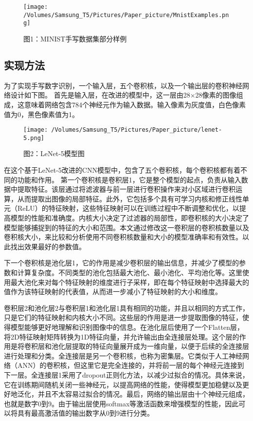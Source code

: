 \documentclass[11pt]{article}
\begin{document}
\begin{figure}[htbp]
\centering
\texttt{[image: /Volumes/Samsung\_T5/Pictures/Paper\_picture/MnistExamples.png]}
\caption{图1：MINIST手写数据集部分样例}
\end{figure}
\subsection{实现方法}
\label{sec:orge2ee836}
为了实现手写数字识别，一个输入层，五个卷积核，以及一个输出层的卷积神经网络设计如下图。
首先是输入层，在改进的模型中，这一层由28×28像素的图像组成，这意味着网络包含784个神经元作为输入数据。输入像素为灰度值，白色像素值为0，黑色像素值为1。

\begin{figure}[htbp]
\centering
\texttt{[image: /Volumes/Samsung\_T5/Pictures/Paper\_picture/lenet-5.png]}
\caption{图2：LeNet-5模型图}
\end{figure}

在这个基于LeNet-5改进的CNN模型中，包含了五个卷积核，每个卷积核都有着不同的功能和作用。
第一个卷积核是卷积层1，它是整个模型的起点，负责从输入数据中提取特征。该层通过将滤波器与前一层进行卷积操作来对小区域进行卷积运算，从而提取出图像的局部特征。此外，它包括多个具有可学习内核和修正线性单元（ReLU）的特征映射，这些特征映射可以在训练过程中不断调整和优化，以提高模型的性能和准确度。内核大小决定了过滤器的局部性，即卷积核的大小决定了模型能够捕捉到的特征的大小和范围。本文通过修改这一卷积层的卷积核数量以及卷积核大小，来比较和分析使用不同卷积核数量和大小的模型准确率和有效性。以此找出效果最好的参数值。

下一个卷积核是池化层1，它的作用是减少卷积层的输出信息，并减少了模型的参数和计算复杂度。不同类型的池化包括最大池化、最小池化、平均池化等。这里使用最大池化来对每个特征映射的维度进行子采样，即在每个特征映射中选择最大的值作为该特征映射的代表值，从而进一步减小了特征映射的大小和维度。

卷积层2和池化层2与卷积层1和池化层1具有相同的功能，并且以相同的方式工作，只是它们的特征映射和内核大小不同。这些层的作用是进一步提取图像的特征，使得模型能够更好地理解和识别图像中的信息。在池化层后使用了一个Flatten层，将2D特征映射矩阵转换为1D特征向量，并允许输出由全连接层处理。这个层的作用是将卷积层和池化层提取的特征向量展开成为一维向量，以便于后续的全连接层进行处理和分类。全连接层是另一个卷积核，也称为密集层。它类似于人工神经网络（ANN）的卷积核，但这里它是完全连接的，并将前一层的每个神经元连接到下一层。全连接层1采用了dropout正则化方法，以减少过拟合的情况。具体来说，它在训练期间随机关闭一些神经元，以提高网络的性能，使得模型更加稳健以及更好地泛化，并且不太容易过拟合的情况。最后，网络的输出层由十个神经元组成，也就是数字0到9。由于输出层使用softmax等激活函数来增强模型的性能，因此可以将具有最高激活值的输出数字从0到9进行分类。
\end{document}
